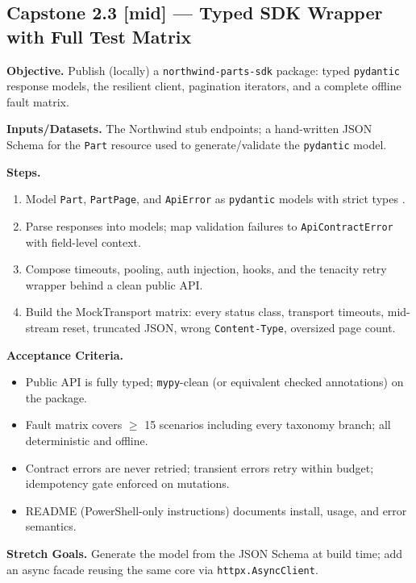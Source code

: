 \subsection{Capstone 2.3 [mid] --- Typed SDK Wrapper with Full Test Matrix}

\textbf{Objective.} Publish (locally) a \texttt{northwind-parts-sdk} package:
typed \texttt{pydantic} response models, the resilient client, pagination
iterators, and a complete offline fault matrix.

\textbf{Inputs/Datasets.} The Northwind stub endpoints; a hand-written JSON
Schema for the \texttt{Part} resource used to generate/validate the
\texttt{pydantic} model.

\textbf{Steps.}
\begin{enumerate}
  \item Model \texttt{Part}, \texttt{PartPage}, and \texttt{ApiError} as
        \texttt{pydantic} models with strict types \cite{pydanticdocs}.
  \item Parse responses into models; map validation failures to
        \texttt{ApiContractError} with field-level context.
  \item Compose timeouts, pooling, auth injection, hooks, and the tenacity
        retry wrapper behind a clean public API.
  \item Build the MockTransport matrix: every status class, transport
        timeouts, mid-stream reset, truncated JSON, wrong
        \texttt{Content-Type}, oversized page count.
\end{enumerate}

\textbf{Acceptance Criteria.}
\begin{itemize}
  \item[$\square$] Public API is fully typed; \texttt{mypy}-clean (or
        equivalent checked annotations) on the package.
  \item[$\square$] Fault matrix covers $\ge$ 15 scenarios including every
        taxonomy branch; all deterministic and offline.
  \item[$\square$] Contract errors are never retried; transient errors retry
        within budget; idempotency gate enforced on mutations.
  \item[$\square$] README (PowerShell-only instructions) documents install,
        usage, and error semantics.
\end{itemize}

\textbf{Stretch Goals.} Generate the model from the JSON Schema at build
time; add an async facade reusing the same core via
\texttt{httpx.AsyncClient}.

